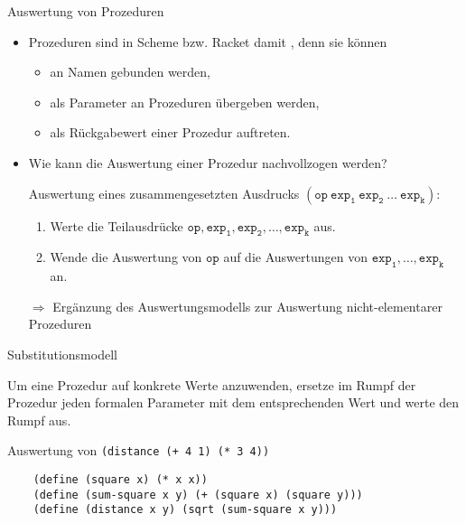 \begin{frame}[t,fragile]{Auswertung von Prozeduren}
	\begin{itemize}
		\item Prozeduren sind in Scheme bzw. Racket damit  , denn sie können
		\begin{itemize}
			\item an Namen gebunden werden,
			\item als Parameter an Prozeduren übergeben werden,
			\item als Rückgabewert einer Prozedur auftreten.
			\minoritem {}
		\end{itemize} \pause
		\item Wie kann die Auswertung einer Prozedur nachvollzogen werden?
		\begin{mybox}
			Auswertung eines zusammengesetzten Ausdrucks $\mathtt{(op \ exp_1 \ exp_2 \ \dots \ exp_k)}$:
			\begin{enumerate}[(1)]
				\item Werte die Teilausdrücke $\mathtt{op}, \mathtt{exp_1}, \mathtt{exp_2}, \dots, \mathtt{exp_k}$ aus.
				\item Wende die Auswertung von $\mathtt{op}$ auf die Auswertungen von $\mathtt{exp_1}, \dots, \mathtt{exp_k}$ an.
			\end{enumerate}
		\end{mybox} \pause
		\item[$\Rightarrow$] Ergänzung des Auswertungsmodells zur Auswertung nicht-elementarer Prozeduren
	\end{itemize}
\end{frame}

\begin{frame}[t,fragile]{Substitutionsmodell}
	\begin{mybox}
		Um eine Prozedur auf konkrete Werte anzuwenden, ersetze im Rumpf der Prozedur jeden formalen Parameter mit dem entsprechenden Wert und werte den Rumpf aus. 
	\end{mybox} \pause
	
	\vspace*{0.5cm}
	
	 Auswertung von \texttt{(distance (+ 4 1) (* 3 4))}
	\begin{verbatim}
	(define (square x) (* x x))
	(define (sum-square x y) (+ (square x) (square y)))
	(define (distance x y) (sqrt (sum-square x y)))
	\end{verbatim}
\end{frame}

